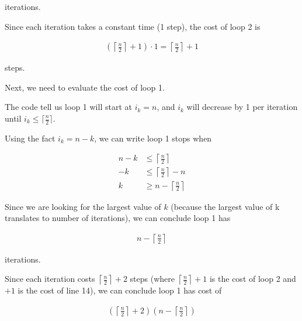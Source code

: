 \documentclass[12pt]{article}
\begin{document}
\begin{enumerate}[a.]
\begin{mdframed}
        iterations.

        \bigskip

        Since each iteration takes a constant time (1 step), the cost of loop 2
        is

        \color{red}
        \begin{align}
            \left( \left\lceil \frac{n}{2} \right\rceil + 1 \right) \cdot 1 = \left\lceil \frac{n}{2} \right\rceil + 1
        \end{align}
        \color{black}

        steps.

        \bigskip

        Next, we need to evaluate the cost of loop 1.

        \bigskip

        The code tell us loop 1 will start at $i_k = n$, and $i_k$ will decrease by 1
        per iteration until $i_k \leq \lceil \frac{n}{2} \rceil$.

        \bigskip

        Using the fact \color{red}$i_k = n - k$\color{black}, we can write loop
        1 stops when

        \begin{align}
            n - k &\leq \left\lceil \frac{n}{2} \right\rceil\\
            -k &\leq \left\lceil \frac{n}{2} \right\rceil - n\\
            k &\geq n - \left\lceil \frac{n}{2} \right\rceil
        \end{align}

        \bigskip

        Since we are looking for the largest value of $k$ (because the largest value of
        k translates to number of iterations), we can conclude loop 1
        has

        \begin{align}
            n - \left\lceil \frac{n}{2} \right\rceil
        \end{align}

        iterations.

        \bigskip

        Since \color{red}each iteration costs $\left\lceil \frac{n}{2} \right\rceil + 2$ steps (where
        $\left\lceil \frac{n}{2} \right\rceil + 1$ is the cost of loop 2 and $+1$
        is the cost of line 14)\color{black}, we can conclude loop 1 has cost of

        \color{red}
        \begin{align}
            \left(\left\lceil \frac{n}{2} \right\rceil + 2 \right)\left( n - \left\lceil \frac{n}{2} \right\rceil \right)
        \end{align}
        \color{black}


\end{mdframed}
\end{enumerate}
\end{document}
